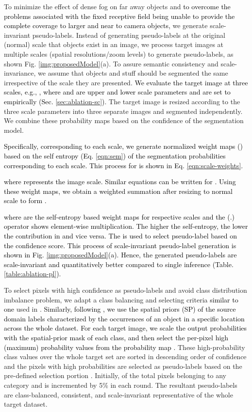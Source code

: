 \documentclass[final,5p,times,twocolumn]{elsarticle}
\begin{document}
To minimize the effect of dense fog on far away objects and \textcolor{black}{to overcome the problems associated with the fixed receptive field being unable to provide the complete coverage to larger and near to camera objects,} we generate scale-invariant pseudo-labels.
Instead of generating pseudo-labels at the original (normal) scale that objects exist in an image, we  process target images at multiple scales (spatial resolutions/zoom levels) to generate pseudo-labels, as shown Fig. \ref{img:proposedModel}(a). To assure semantic consistency and scale-invariance, we assume that objects and stuff should be segmented the same irrespective of the scale they are presented.
\textcolor{black}{We evaluate the target image at three scales, e.g., , where  and  are upper and lower scale parameters and are set to  empirically (Sec. \ref{sec:ablation-sc})}. The target image is resized according to the three scale parameters into three separate images and segmented independently. 
We combine these probability maps based on the confidence of the segmentation model. \textcolor{black}{Specifically, corresponding to each scale, we generate normalized weight maps () based on the self entropy  (Eq. \ref{eqn:sem}) of the segmentation probabilities corresponding to each scale. This process for  is shown in Eq. \ref{eqn:scale-weights}.

where  represents the image scale.
Similar equations can be written for . Using these weight maps, we obtain a weighted summation after resizing to normal scale to form .

where  are the self-entropy based weight maps for respective scales and the (.) operator shows element-wise multiplication.
The higher the self-entropy, the lower the contribution in   and vice versa. 
The  is used to select pseudo-label based on the confidence score. This process of scale-invariant pseudo-label generation is shown in Fig. \ref{img:proposedModel}(a). 
Hence, the generated pseudo-labels are scale-invariant and quantitatively better compared to single inference (Table. \ref{table:ablation-pl}).
}

To select pixels with high confidence as pseudo-labels and avoid class distribution imbalance problem, we adapt a class balancing and selecting criteria \textcolor{black}{similar to one} used in \cite{zou2019crst}. 
\textcolor{black}{ Similarly, following \cite{zou2018unsupervised, mlsl2020}, we use the spatial priors (SP) of the source domain labels characterized by the occurrences of an object in a specific location across the whole dataset. For each target image, we scale the output probabilities with the spatial-prior mask of each class, and then select the per-pixel high (maximum) probability values from the probability map . }
These high-probability class values over the whole target set are sorted in descending order of confidence and the pixels with high probabilities are selected as pseudo-labels based on the pre-defined selection portion .  Initially,  of the total pixels belonging to any category and is incremented by 5\% in each round. 
The resultant pseudo-labels are class-balanced, consistent, and scale-invariant representative of the whole target dataset. 
\end{document}
